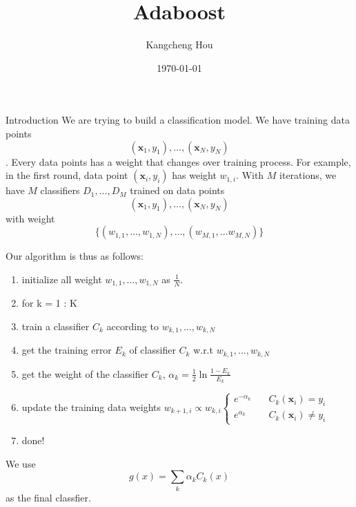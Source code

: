 \documentclass{beamer}
\title{Adaboost}
\author{Kangcheng Hou}
\institute{Zhejiang University}
\date{\today}
\begin{document}
    
\frame{\titlepage}
\begin{frame}[allowframebreaks]{Introduction}
We are trying to build a classification model.
We have training data points $$(\mathbf{x}_1, y_1), \dots, (\mathbf{x}_N, y_N)$$. Every data points has a weight that changes over training process. For example, in the first round, data point $(\mathbf{x}_i, y_i)$ has weight $w_{1,i}$. With $M$ iterations, we have $M$ classifiers $D_1, \dots, D_M$ trained on data points $$(\mathbf{x}_1, y_1), \dots, (\mathbf{x}_N, y_N)$$ with weight $$\{ (w_{1,1}, \dots, w_{1, N}), \dots, (w_{M, 1}, \dots w_{M, N}) \}$$

\framebreak
Our algorithm is thus as follows:
\begin{enumerate}
    
\item initialize all weight $w_{1,1}, \dots, w_{1,N}$ as $\frac{1}{N}$.
\item for k = 1 : K
\item train a classifier $C_k$ according to $w_{k, 1}, \dots, w_{k, N}$
\item get the training error $E_k$ of classifier $C_k$ w.r.t $w_{k, 1}, \dots, w_{k, N}$
\item get the weight of the classifier $C_k$, $\alpha_k = \frac{1}{2} \ln \frac{1 - E_k}{E_k}$
\item update the training data weights $w_{k + 1, i} \propto w_{k, i} \begin{cases} e^{-\alpha_k} & \quad C_k(\mathbf{x}_i) = y_i \\  e^{\alpha_k} & \quad C_k(\mathbf{x}_i) \neq y_i \end{cases}$
\item done!
\end{enumerate}
We use $$g(x) = \sum_k \alpha_k C_k(x)$$ as the final classfier.
\end{frame}
\end{document}
